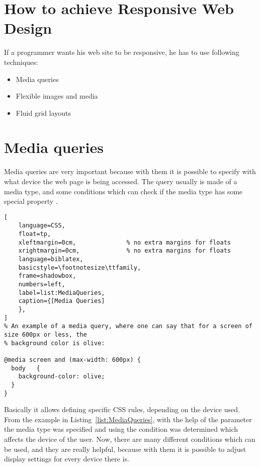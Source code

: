   



\section{How to achieve Responsive Web Design}

If a programmer wants his web site to be responsive, he has to use
following techniques:

\begin{itemize}
    \item Media queries
    \item Flexible images and media
    \item Fluid grid layouts
\end{itemize}


\section{Media queries}

Media queries are very important because with them it is possible to
specify with what device the web page is being accessed. The query
usually is made of a media type, and some conditions which can check if
the media type has some special property \parencite{A.A.Mohamed}.



\begin{lstlisting}[
    language=CSS, 
    float=tp,
    xleftmargin=0cm,              % no extra margins for floats
    xrightmargin=0cm,             % no extra margins for floats
    language=biblatex,
    basicstyle=\footnotesize\ttfamily,
    frame=shadowbox,
    numbers=left,
    label=list:MediaQueries,
    caption={[Media Queries]
    },
]
% An example of a media query, where one can say that for a screen of size 600px or less, the 
% background color is olive:

@media screen and (max-width: 600px) {
  body   {
    background-color: olive;
  }
}
\end{lstlisting}



Basically it allows defining specific CSS rules, depending on the
device used. From the example in Listing~\ref{list:MediaQueries}, with the
help of the parameter  the media type was specified
and using  the condition was determined which
affects the device of the user. Now, there are many different
conditions which can be used, and they are really helpful, because
with them it is possible to adjust display settings for every device
there is.

